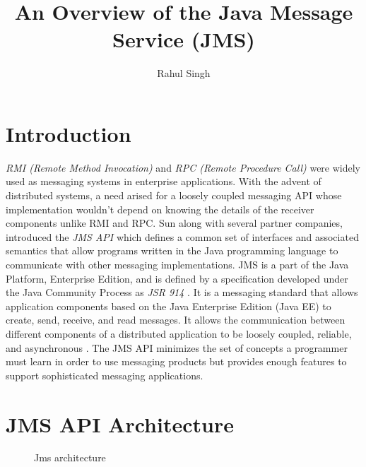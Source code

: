 \documentclass[9pt,twocolumn,twoside]{../../styles/osajnl}
\title{An Overview of the Java Message Service (JMS)}
\author[1]{Rahul Singh}
\affil[1]{School of Informatics and Computing, Bloomington, IN 47408, U.S.A.}
\affil[*]{Corresponding authors: rahpsing@iu.edu}
\begin{document}
\maketitle

\section{Introduction}

\emph{RMI (Remote Method Invocation)} \cite{www-rmi-wiki} and
\emph{RPC (Remote Procedure Call)} \cite{www-rpc-wiki} were widely
used as messaging systems in enterprise applications. With the advent
of distributed systems, a need arised for a loosely coupled messaging
API whose implementation wouldn't depend on knowing the details of the
receiver components unlike RMI and RPC. Sun along with several partner
companies, introduced the \emph{JMS API} \cite{www-jms-wiki} which
defines a common set of interfaces and associated semantics that allow
programs written in the Java programming language to communicate with
other messaging implementations. JMS is a part of the Java Platform,
Enterprise Edition, and is defined by a specification developed under
the Java Community Process as \emph{JSR 914} \cite{www-jms-javajsr}.
It is a messaging standard that allows application components based on
the Java Enterprise Edition (Java EE) to create, send, receive, and
read messages. It allows the communication between different
components of a distributed application to be loosely coupled,
reliable, and asynchronous \cite{www-jms-oracle}. The JMS API
minimizes the set of concepts a programmer must learn in order to use
messaging products but provides enough features to support
sophisticated messaging applications.

\section{JMS API Architecture}

\begin{figure}[htbp]
\centering
{}
\caption{Jms architecture \cite{www-jms-tutorialoracle} }
\label{fig:JMS Objects}
\end{figure}
\end{document}
